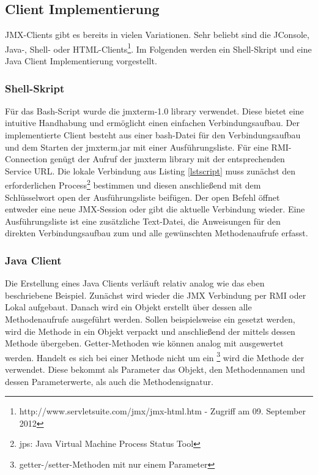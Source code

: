 \subsection{Client Implementierung}

JMX-Clients gibt es bereits in vielen Variationen. Sehr beliebt sind die JConsole, Java-, Shell- oder HTML-Clients\footnote{http://www.servletsuite.com/jmx/jmx-html.htm - Zugriff am 09. September 2012}. Im Folgenden werden ein Shell-Skript und eine Java Client Implementierung vorgestellt.

\subsubsection{Shell-Skript}
 F\"ur das Bash-Script wurde die jmxterm-1.0 library verwendet. Diese bietet eine intuitive Handhabung und ermöglicht einen einfachen Verbindungsaufbau. Der implementierte Client besteht aus einer bash-Datei f\"ur den Verbindungsaufbau und dem Starten der jmxterm.jar mit einer Ausf\"uhrungsliste. F\"ur eine RMI-Connection gen\"ugt der Aufruf der jmxterm library mit der entsprechenden Service URL. Die lokale Verbindung aus Listing \ref{lstscript} muss zun\"achst den erforderlichen  Process\footnote{jps: Java Virtual Machine Process Status Tool} bestimmen und diesen anschlie\ss end mit dem Schl\"usselwort open der Ausf\"uhrungsliste beif\"ugen. Der open Befehl \"offnet entweder eine neue JMX-Session oder gibt die aktuelle Verbindung wieder.
Eine Ausf\"uhrungsliste ist eine zus\"atzliche Text-Datei, die Anweisungen f\"ur den direkten Verbindungsaufbau zum  und alle gew\"unschten Methodenaufrufe erfasst.  

\begin{figure}[!htb]
	
	
\end{figure}

\subsubsection{Java Client}

Die Erstellung eines Java Clients verl\"auft relativ analog wie das eben beschriebene Beispiel. Zun\"achst wird wieder die JMX Verbindung per RMI oder Lokal aufgebaut. Danach wird ein  Objekt erstellt \"uber dessen alle Methodenaufrufe ausgef\"uhrt werden. Sollen beispielsweise ein  gesetzt werden, wird die Methode  in ein  Objekt verpackt und anschlie\ss end der  mittels dessen Methode  \"ubergeben. Getter-Methoden wie  k\"onnen analog mit  ausgewertet werden. Handelt es sich bei einer Methode nicht um ein \footnote{getter-/setter-Methoden mit nur einem Parameter} wird die Methode  der  verwendet. Diese bekommt als Parameter das  Objekt, den Methodennamen und dessen Parameterwerte, als auch die Methodensignatur.

